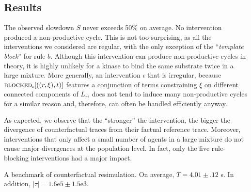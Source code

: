 \subsection{Results}

The observed slowdown $S$ never exceeds 50\% on average. No intervention
produced a non-productive cycle. This is not too surprising, as all the
interventions we considered are regular, with the only exception of the
``\textit{template block}'' for rule $b$. Although this intervention can produce
non-productive cycles in theory, it is highly unlikely for a kinase to bind the same substrate twice in a large mixture. More
generally, an intervention $\iota$ that is irregular, because
${\textsc{blocked}}_{\iota}[((r, \xi), t)]$ features a conjunction of terms constraining
$\xi$ on different connected components of $L_r$, does not tend to induce many
non-productive cycles for a similar reason and, therefore, can often be handled
efficiently anyway.

As expected, we observe that the ``stronger'' the intervention, the bigger the divergence of counterfactual traces from their factual reference trace. Moreover, interventions that only affect a small number of
agents in a large mixture do not cause major divergences at the population level. In fact, only the five rule-blocking interventions had a major impact.



 \begin{table}\footnotesize
  \begin{center}
    
  \end{center}
  \caption{
A benchmark of counterfactual resimulation. On average,
    $T = 4.01\pm .12$ s.  In addition,
    $|\tau| = 1.6\mathrm{e}5 \pm 1.5\mathrm{e}3$.}\label{tab:bench}
\end{table}
